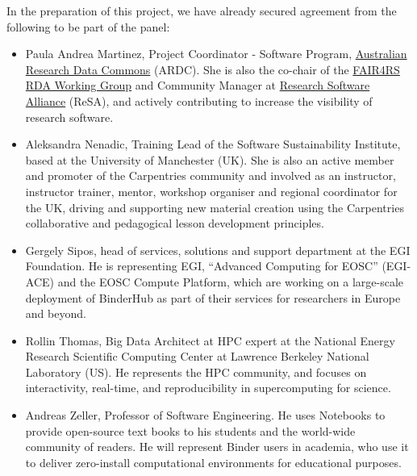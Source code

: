 In the preparation of this project, we have already secured agreement from the
following to be part of the panel:
\begin{itemize}
\item Paula Andrea Martinez, Project Coordinator - Software Program, \href{https://ardc.edu.au/}{Australian Research Data Commons} (ARDC).
She is also the co-chair of the \href{https://www.rd-alliance.org/groups/fair-research-software-fair4rs-wg}{FAIR4RS RDA Working Group} and
Community Manager at \href{https://www.researchsoft.org/}{Research Software Alliance} (ReSA), and actively contributing
to increase the visibility of research software.
\item Aleksandra Nenadic, Training Lead of the Software Sustainability Institute, 
based at the University of Manchester (UK). She is also an active member and 
promoter of the Carpentries community and involved as an instructor, 
instructor trainer, mentor, workshop organiser and regional coordinator 
for the UK, driving and supporting new material creation using the 
Carpentries collaborative and pedagogical lesson development principles.
\item Gergely Sipos, head of services, solutions and support department at the
  EGI Foundation. He is representing EGI, ``Advanced Computing for EOSC''
  (EGI-ACE) and the EOSC Compute Platform, which are working on a large-scale
  deployment of BinderHub as part of their services for researchers in Europe
  and beyond.
\item Rollin Thomas, Big Data Architect at HPC expert at the National Energy
  Research Scientific Computing Center at Lawrence Berkeley National Laboratory
  (US). He represents the HPC community, and focuses on interactivity,
  real-time, and reproducibility in supercomputing for science.
\item Andreas Zeller, Professor of Software Engineering. He uses Notebooks 
  to provide open-source text books to his students and the world-wide
  community of readers. He will represent Binder users in academia, who use it 
  to deliver zero-install computational environments for educational
  purposes.
\end{itemize}
